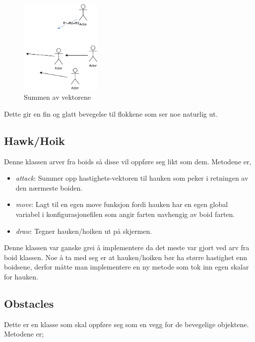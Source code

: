 {\begin{figure}[hbt!]
{\centering
    \includegraphics[width=0.35\textwidth]{rulelast.pdf}
    \caption{Summen av vektorene}
    \label{sumvektor}
\par}
\end{figure}

Dette gir en fin og glatt bevegelse til flokkene som ser noe naturlig ut.


\subsection{Hawk/Hoik}

Denne klassen arver fra boids så disse vil oppføre seg likt som dem. Metodene er,

\begin{itemize}
    \item \emph{attack}: Summer opp hastighets-vektoren til hauken som peker i retningen av den nærmeste boiden.
    \item \emph{move}: Lagt til en egen move funksjon fordi hauken har en egen global variabel i konfigurasjonefilen som angir farten uavhengig av boid farten.
    \item \emph{draw}: Tegner hauken/hoiken ut på skjermen.
\end{itemize}


Denne klassen var ganske grei å implementere da det meste var gjort ved arv fra boid klassen.
Noe å ta med seg er at hauken/hoiken bør ha større hastighet enn boidsene, derfor måtte man implementere en ny metode som tok inn egen skalar for hauken.



\subsection{Obstacles}
Dette er en klasse som skal oppføre seg som en vegg for de bevegelige objektene. Metodene er;

}
